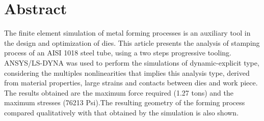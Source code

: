 \chapter*{Abstract}

The finite element simulation of metal forming processes is an auxiliary tool in the design and optimization of dies. This article presents the analysis of stamping process of an AISI 1018 steel tube, using a two steps progressive tooling. ANSYS/LS-DYNA was used to perform the simulations of dynamic-explicit type, considering the multiples nonlinearities that implies this analysis type, derived from material properties, large strains and contacts between dies and work piece. The results obtained are the maximum force required (1.27 tons) and the maximum stresses (76213 Psi).The resulting geometry of the forming process compared qualitatively with that obtained by the simulation is also shown.